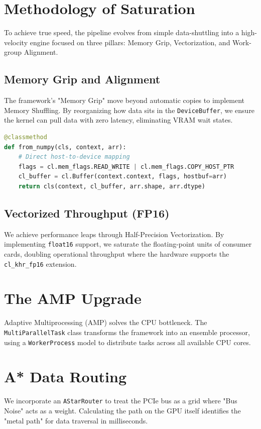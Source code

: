 \documentclass[10pt,twocolumn]{article}
\begin{document}
\section{Methodology of Saturation}
To achieve true speed, the pipeline evolves from simple data-shuttling into a high-velocity engine focused on three pillars: Memory Grip, Vectorization, and Work-group Alignment.

\subsection{Memory Grip and Alignment}
The framework's "Memory Grip" move beyond automatic copies to implement Memory Shuffling. By reorganizing how data sits in the \texttt{DeviceBuffer}, we ensure the kernel can pull data with zero latency, eliminating VRAM wait states.

\begin{lstlisting}[language=Python, caption=Low-level Buffer Initialization]
@classmethod
def from_numpy(cls, context, arr):
    # Direct host-to-device mapping
    flags = cl.mem_flags.READ_WRITE | cl.mem_flags.COPY_HOST_PTR
    cl_buffer = cl.Buffer(context.context, flags, hostbuf=arr)
    return cls(context, cl_buffer, arr.shape, arr.dtype)
\end{lstlisting}

\subsection{Vectorized Throughput (FP16)}
We achieve performance leaps through Half-Precision Vectorization. By implementing \texttt{float16} support, we saturate the floating-point units of consumer cards, doubling operational throughput where the hardware supports the \texttt{cl\_khr\_fp16} extension.

\section{The AMP Upgrade}
Adaptive Multiprocessing (AMP) solves the CPU bottleneck. The \texttt{MultiParallelTask} class transforms the framework into an ensemble processor, using a \texttt{WorkerProcess} model to distribute tasks across all available CPU cores.

\section{A* Data Routing}
We incorporate an \texttt{AStarRouter} to treat the PCIe bus as a grid where "Bus Noise" acts as a weight. Calculating the path on the GPU itself identifies the "metal path" for data traversal in milliseconds.
\end{document}
